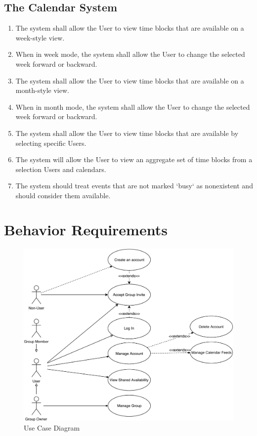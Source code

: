 \documentclass{scrreprt}
\begin{document}
\subsection{The Calendar System}
    \begin{enumerate}
    \item The system shall allow the User to view time blocks that are available on a week-style view.
    \item When in week mode, the system shall allow the User to change the selected week forward or backward.
    \item The system shall allow the User to view time blocks that are available on a month-style view.
    \item When in month mode, the system shall allow the User to change the selected week forward or backward.
    \item The system shall allow the User to view time blocks that are available by selecting specific Users.
    \item The system will allow the User to view an aggregate set of time blocks from a selection Users and calendars.
    \item The system should treat events that are not marked `busy` as nonexistent and should consider them available.
    \end{enumerate}


\section{Behavior Requirements}

\begin{figure}[ht]
    \centering
    \includegraphics[width=1\textwidth]{CalendarProjectUseCases}
    \caption{Use Case Diagram}
    \label{fig:use-case}
\end{figure}
\end{document}
